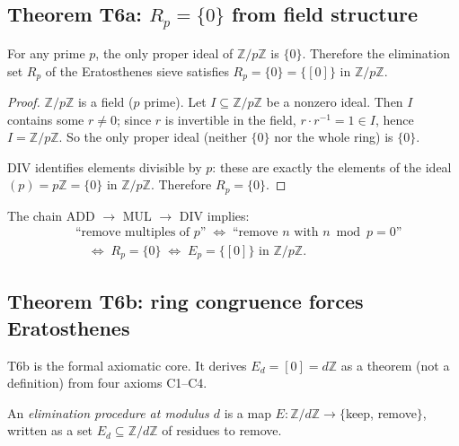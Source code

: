 \documentclass[12pt,a4paper]{article}
\begin{document}
\subsection{Theorem T6a: $R_p = \{0\}$ from field structure}
\label{sec:T6_restricted}

\mTHM
\begin{theorem}
\label{thm:T6_restricted}
For any prime $p$, the only proper ideal of $\mathbb{Z}/p\mathbb{Z}$
is $\{0\}$. Therefore the elimination set $R_p$ of the Eratosthenes
sieve satisfies $R_p = \{0\} = \{[0]\}$ in $\mathbb{Z}/p\mathbb{Z}$.

\begin{proof}
$\mathbb{Z}/p\mathbb{Z}$ is a field ($p$ prime). Let $I \subseteq
\mathbb{Z}/p\mathbb{Z}$ be a nonzero ideal. Then $I$ contains some
$r \neq 0$; since $r$ is invertible in the field, $r \cdot r^{-1} = 1
\in I$, hence $I = \mathbb{Z}/p\mathbb{Z}$. So the only proper ideal
(neither $\{0\}$ nor the whole ring) is $\{0\}$.

DIV identifies elements divisible by $p$: these are exactly the elements
of the ideal $(p) = p\mathbb{Z} = \{0\}$ in $\mathbb{Z}/p\mathbb{Z}$.
Therefore $R_p = \{0\}$.
\end{proof}
\end{theorem}

\begin{corollary}
The chain ADD $\to$ MUL $\to$ DIV implies:
\begin{align*}
  &\text{``remove multiples of } p\text{''} \;\iff\;
  \text{``remove } n \text{ with } n \bmod p = 0\text{''} \\
  &\quad\iff\; R_p = \{0\} \;\iff\; E_p = \{[0]\} \text{ in } \mathbb{Z}/p\mathbb{Z}.
\end{align*}
\end{corollary}

\subsection{Theorem T6b: ring congruence forces Eratosthenes}
\label{sec:T6_universal}

T6b is the formal axiomatic core. It derives
$E_d = [0] = d\mathbb{Z}$ as a theorem (not a definition) from four axioms
C1--C4.

\begin{definition}
An \emph{elimination procedure at modulus $d$} is a map
$E : \mathbb{Z}/d\mathbb{Z} \to \{$keep, remove$\}$, written as a set
$E_d \subseteq \mathbb{Z}/d\mathbb{Z}$ of residues to remove.
\end{definition}
\end{document}
